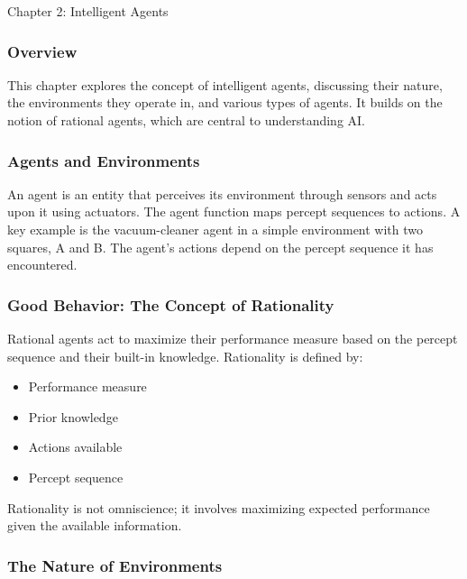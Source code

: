 \begin{notes}{Chapter 2: Intelligent Agents}
    \subsubsection*{Overview}

    This chapter explores the concept of intelligent agents, discussing their nature, the environments they operate in, and various types of agents. It builds on the notion of rational agents, which 
    are central to understanding AI.

    \subsubsection*{Agents and Environments}

    An agent is an entity that perceives its environment through sensors and acts upon it using actuators. The agent function maps percept sequences to actions. A key example is the vacuum-cleaner 
    agent in a simple environment with two squares, A and B. The agent's actions depend on the percept sequence it has encountered.

    \subsubsection*{Good Behavior: The Concept of Rationality}

    Rational agents act to maximize their performance measure based on the percept sequence and their built-in knowledge. Rationality is defined by:
    \begin{itemize}
        \item Performance measure
        \item Prior knowledge
        \item Actions available
        \item Percept sequence
    \end{itemize}
    Rationality is not omniscience; it involves maximizing expected performance given the available information.

    \subsubsection*{The Nature of Environments}


\end{notes}
